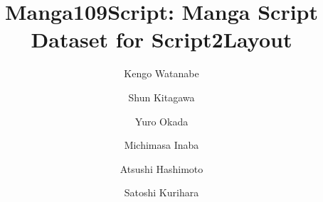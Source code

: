 \documentclass[sigconf, screen, review, anonymous]{acmart}
\begin{document}
\title{Manga109Script: Manga Script Dataset for Script2Layout}

\author{Kengo Watanabe}
\author{Shun Kitagawa}
\author{Yuro Okada}
\author{Michimasa Inaba}
\author{Atsushi Hashimoto}
\author{Satoshi Kurihara}










\renewcommand{\shortauthors}{Trovato et al.}
\end{document}
